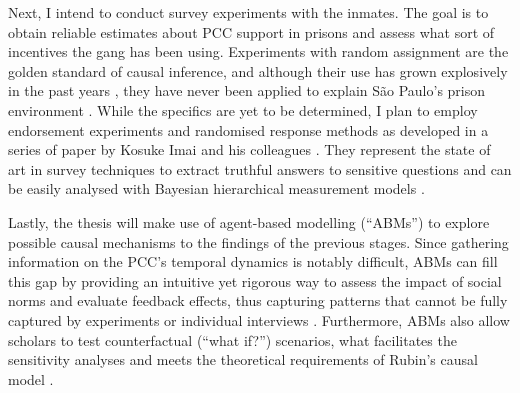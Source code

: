 \documentclass[a4paper,11pt]{article}
\begin{document}
Next, I intend to conduct survey experiments with the inmates. The goal is to obtain reliable estimates about PCC support in prisons and assess what sort of incentives the gang has been using. Experiments with random assignment are the golden standard of causal inference, and although their use has grown explosively in the past years \citep{druckman2011cambridge,morton2010experimental}, they have never been applied to explain São Paulo's prison environment \citep{dias2011pulverizaccao}. While the specifics are yet to be determined, I plan to employ endorsement experiments and randomised response methods as developed in a series of paper by Kosuke Imai and his colleagues \citep{blair2014comparing, bullock2011statistical, rosenfeld2014empirical}. They represent the state of art in survey techniques to extract truthful answers to sensitive questions and can be easily analysed with Bayesian hierarchical measurement models \citep{fox2001bayesian, gelman2014bayesian,imai2011multivariate}.

Lastly, the thesis will make use of agent-based modelling (``ABMs'') to explore possible causal mechanisms to the findings of the previous stages. Since gathering information on the PCC's temporal dynamics is notably difficult, ABMs can fill this gap by providing an intuitive yet rigorous way to assess the impact of social norms and evaluate feedback effects, thus capturing patterns that cannot be fully captured by experiments or individual interviews \citep{axelrod1997complexity, epstein2006generative}. Furthermore, ABMs also allow scholars to test counterfactual (``what if?'') scenarios, what facilitates the sensitivity analyses and meets the theoretical requirements of Rubin's causal model \citep{holland1986statistics, rubin2005causal}.

\vspace{.45cm}
\end{document}
